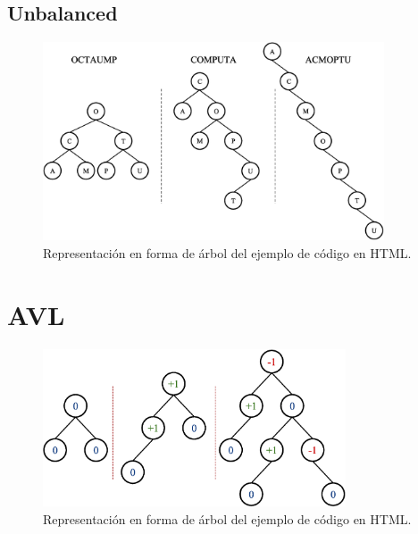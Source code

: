 \subsection{Unbalanced}

\begin{figure}[htpb!]
  \begin{center}
    \includegraphics[width=0.9\textwidth]{images/BSTDesequilibrado.eps}
  \end{center}
  \caption{Representación en forma de árbol del ejemplo de código en HTML.}
  \label{fig:BSTDesequilibrado}
\end{figure}

\section{AVL}

\begin{figure}[htpb!]
  \begin{center}
    \includegraphics[width=0.8\textwidth]{images/AVLExample1.eps}
  \end{center}
  \caption{Representación en forma de árbol del ejemplo de código en HTML.}
  \label{fig:AVLExample1}
\end{figure}

